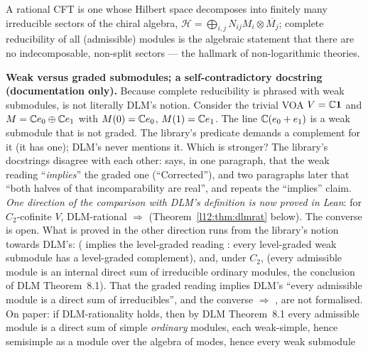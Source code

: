 \begin{physics}
A rational CFT is one whose Hilbert space decomposes into finitely many irreducible sectors of the chiral algebra,
$\mathcal H = \bigoplus_{i,j}N_{ij}M_i\otimes\overline{M_j}$; complete reducibility of all (admissible) modules is the
algebraic statement that there are no indecomposable, non-split sectors --- the hallmark of non-logarithmic theories.
\end{physics}

\begin{warning}
\textbf{Weak versus graded submodules; a self-contradictory docstring (documentation only).} Because complete reducibility is phrased
with weak submodules,  is not literally DLM's notion. Consider the trivial VOA $V = {\mathbb{C}}\mathbf{1}$
and $M = {\mathbb{C}} e_0\oplus{\mathbb{C}} e_1$ with $M(0) = {\mathbb{C}} e_0$, $M(1) = {\mathbb{C}} e_1$. The line ${\mathbb{C}}(e_0+e_1)$ is a weak submodule that is not
graded. The library's predicate demands a complement for it (it has one); DLM's never mentions it. Which is stronger? The
library's docstrings disagree with each other:  says, in one paragraph, that the
weak reading ``\emph{implies}'' the graded one (``Corrected''), and two paragraphs later that ``both halves of that
incomparability are real'', and  repeats the ``implies'' claim. \emph{One direction of
the comparison with DLM's definition is now proved in Lean}: for $C_2$-cofinite $V$, DLM-rational $\Rightarrow$
 (Theorem~\ref{l12:thm:dlmrat} below). The converse is open. What is proved in the other
direction runs from the library's notion towards DLM's:
 ( implies the level-graded reading
: every level-graded weak submodule has a level-graded complement), and, under $C_2$,
\allowbreak{}\allowbreak{}\allowbreak{}\allowbreak{}
(every admissible module is an internal direct sum of irreducible ordinary modules, the conclusion of DLM Theorem~8.1).
That the graded reading implies DLM's ``every admissible module is a direct sum of irreducibles'', and the converse
 $\Rightarrow$ , are not formalised. On paper: if DLM-rationality holds, then by DLM Theorem~8.1 every admissible module is a direct sum of simple
\emph{ordinary} modules, each weak-simple, hence semisimple as a module over the algebra of modes, hence every weak submodule

\end{warning}
